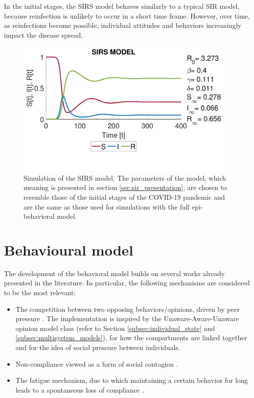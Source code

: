 In the initial stages, the SIRS model behaves similarly to a typical SIR model, because reinfection is unlikely to occur in a short time frame. However, over time, as reinfections become possible, individual attitudes and behaviors increasingly impact the disease spread.

\begin{figure}[ht]
	\centering
	\includegraphics[width=0.6\linewidth]{1_corpo/figure/r0/sirs_figure}
	\caption[SIRS simulation]{Simulation of the SIRS model. The parameters of the model, which meaning is presented in section \ref{sec:sir_presentation}, are chosen to resemble those of the initial stages of the COVID-19 pandemic \cite{data_R0_covid} and are the same as those used for simulations with the full epi-behavioral model.}
	\label{fig:sirsfigure}
\end{figure}

\section{Behavioural model}
\label{sec:behavioral_model}

The development of the behavioral model builds on several works already presented in the literature. In particular, the following mechanisms are considered to be the most relevant:
\begin{itemize}
	\item The competition between two opposing behaviors/opinions, driven by peer pressure \cite{Epstein_2021}. The implementation is inspired by the Unaware-Aware-Unaware opinion model class \cite{Zuo2022, Peng2021} (refer to Section \ref{subsec:individual_state} and \ref{subsec:multisystem_models}), for how the compartments are linked together and for the idea of social pressure between individuals.
	
	\item Non-compliance viewed as a form of social contagion \cite{Bongarti2023}.
	 
	\item The fatigue mechanism, due to which maintaining a certain behavior for long leads to a spontaneous loss of compliance \cite{Epstein_2021}.
\end{itemize}

